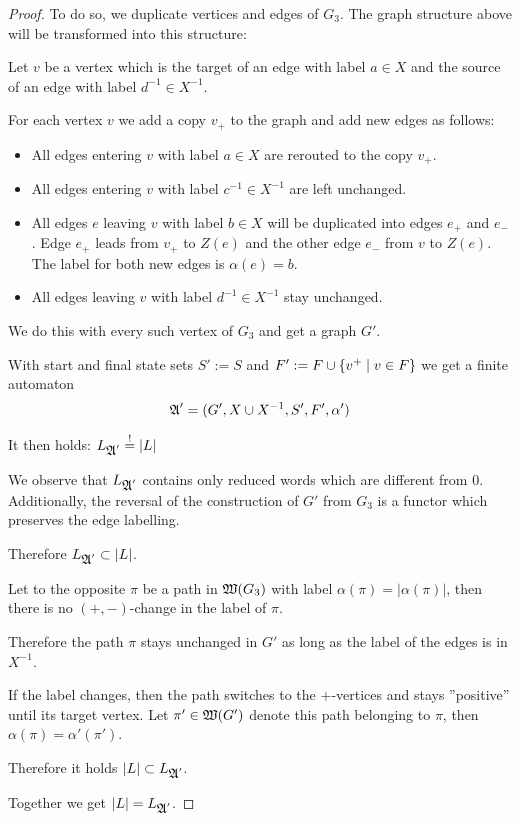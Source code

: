 \begin{proof}
To do so, we duplicate vertices and edges of $G_3$. The graph structure
above will be transformed into this structure:

\begin{center}

\end{center}

Let $v$ be a vertex which is the target of an edge with label $a \in X$ and the
source of an edge with label $d^{-1} \in X^{-1}$.

For each vertex $v$ we add a copy $v_{+}$ to the graph and add new edges as
follows:
\begin{itemize}
  \item All edges entering $v$ with label $a \in X$ are rerouted to the copy
  $v_{+}$.
  \item All edges entering $v$ with label $c^{-1} \in X^{-1}$ are left
  unchanged.
  \item All edges $e$ leaving $v$ with label $b \in X$ will be
  duplicated into edges $e_{+}$ and $e_{-}$. Edge $e_{+}$ leads from $v_{+}$
  to $Z(e)$ and the other edge $e_{-}$ from $v$ to $Z(e)$. The label for
  both new edges is $\alpha(e) = b$.
	\item All edges leaving $v$ with label $d^{-1} \in X^{-1}$ stay unchanged.
\end{itemize}
We do this with every such vertex of $G_3$ and get a graph $G'$.

With start and final state sets $S' := S$ and $F' := F \cup \mbox{$\{v^+ \mid v
\in F\}$}$ we get a finite automaton
\[ \mbox{$\mathfrak{A}$}' = (G', X \cup {X}^{-1}, S', F', \alpha') \]

It then holds: $L_{\mbox{$\mathfrak{A}$}'} \stackrel{!}{=} |L|$

We observe that $L_{\mbox{$\mathfrak{A}$}'}$ contains only reduced words which are different
from $0$. Additionally, the reversal of the construction of $G'$ from $G_3$ is a
functor which preserves the edge labelling.

Therefore $L_{\mbox{$\mathfrak{A}$}'} \subset |L|$.

\bigskip
Let to the opposite $\pi$ be a path in $\mbox{$\mathfrak{W}(G_3)$}$ with label $\alpha(\pi)
= |\alpha(\pi)|$, then there is no $(+, -)$-change in the label of $\pi$.

Therefore the path $\pi$ stays unchanged in $G'$ as long as the label
of the edges is in $X^{-1}$.

If the label changes, then the path switches to the $+$-vertices and stays
''positive'' until its target vertex. Let $\pi' \in \mbox{$\mathfrak{W}(G')$}$ denote this
path belonging to $\pi$, then $\alpha(\pi) = \alpha'(\pi')$.

Therefore it holds $|L| \subset L_{\mbox{$\mathfrak{A}$}'}$.

Together we get $|L| = L_{\mbox{$\mathfrak{A}$}'}$.
\end{proof}


